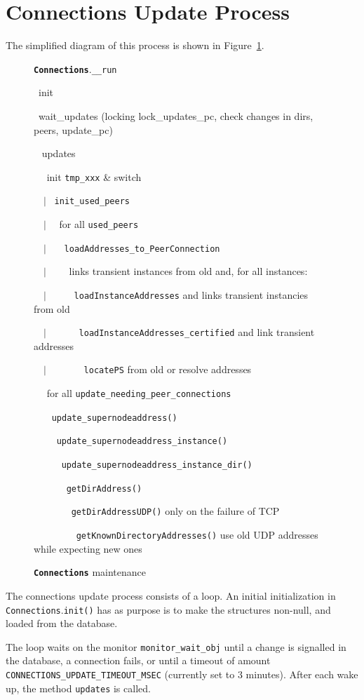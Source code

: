 \documentclass{book}
\newcommand{\pkg}[1]{{\tt #1}}
\newcommand{\cls}[1]{{\tt\bf #1}}
\newcommand{\mth}[1]{{\tt #1}}
\newcommand{\mmb}[1]{{\tt #1}}
\begin{document}
\section{Connections Update Process}
The simplified diagram of this process is shown in Figure~\ref{fig:conn_update}.
\begin{figure}[!ht]
\noindent
\noindent
\strut\cls{Connections}.\mth{\_\_run} \\
\strut~init \\
\strut~wait\_updates (locking lock\_updates\_pc, check changes in dirs, peers, update\_pc) \\
\strut~ updates\\
\strut~~ init \mmb{tmp\_xxx} \& switch \\
\strut~~$|$~ \mth{init\_used\_peers} \\
\strut~~$|$~~ for all \mmb{used\_peers} \\
\strut~~$|$~~~ \mth{loadAddresses\_to\_PeerConnection} \\
\strut~~$|$~~~~ links transient instances from old and, for all instances:\\
\strut~~$|$~~~~~ \mth{loadInstanceAddresses}  and links transient instancies from old\\
\strut~~$|$~~~~~~ \mth{loadInstanceAddresses\_certified} and link transient addresses\\
\strut~~$|$~~~~~~~ \mth{locatePS} from old  or resolve addresses\\
\strut~~ for all \mmb{update\_needing\_peer\_connections} \\
\strut~~~ \mth{update\_supernodeaddress()} \\
\strut~~~~ \mth{update\_supernodeaddress\_instance()} \\
\strut~~~~~ \mth{update\_supernodeaddress\_instance\_dir()} \\
\strut~~~~~~ \mth{getDirAddress()} \\
\strut~~~~~~~ \mth{getDirAddressUDP()} only on the failure of TCP \\
\strut~~~~~~~~ \mth{getKnownDirectoryAddresses()} use old UDP addresses while expecting new ones \\
\caption{\cls{Connections} maintenance}\label{fig:conn_update}
\end{figure}
The connections update process consists of a loop. 
An initial initialization in \pkg{Connections}.\mth{init()} has as purpose is to make the 
structures non-null, and loaded from the database.

The loop waits on the monitor \mmb{monitor\_wait\_obj} until a change is signalled in the database, a connection fails, or until a timeout of amount \mmb{CONNECTIONS\_UPDATE\_TIMEOUT\_MSEC} (currently set to 3 minutes).
After each wake up, the method \mth{updates} is called.
\end{document}
